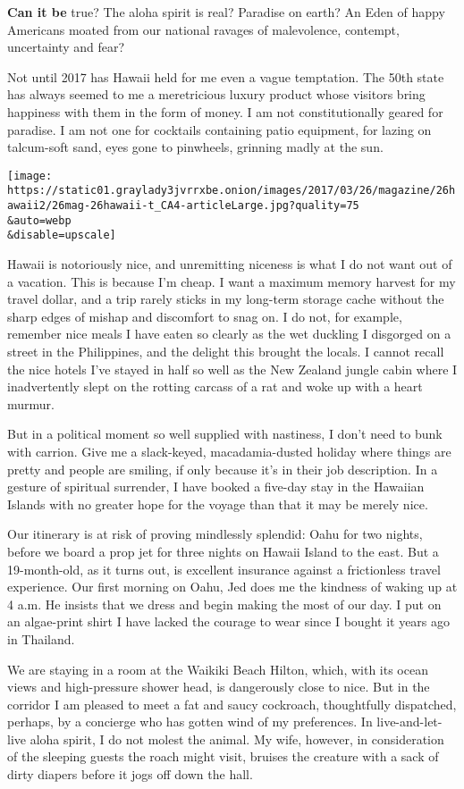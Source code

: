 \textbf{Can it be} true? The aloha spirit is real? Paradise on earth? An
Eden of happy Americans moated from our national ravages of malevolence,
contempt, uncertainty and fear?

Not until 2017 has Hawaii held for me even a vague temptation. The 50th
state has always seemed to me a meretricious luxury product whose
visitors bring happiness with them in the form of money. I am not
constitutionally geared for paradise. I am not one for cocktails
containing patio equipment, for lazing on talcum-soft sand, eyes gone to
pinwheels, grinning madly at the sun.

\texttt{[image: https://static01.graylady3jvrrxbe.onion/images/2017/03/26/magazine/26hawaii2/26mag-26hawaii-t\_CA4-articleLarge.jpg?quality=75\\\&auto=webp\\\&disable=upscale]}

Hawaii is notoriously nice, and unremitting niceness is what I do not
want out of a vacation. This is because I'm cheap. I want a maximum
memory harvest for my travel dollar, and a trip rarely sticks in my
long-term storage cache without the sharp edges of mishap and discomfort
to snag on. I do not, for example, remember nice meals I have eaten so
clearly as the wet duckling I disgorged on a street in the Philippines,
and the delight this brought the locals. I cannot recall the nice hotels
I've stayed in half so well as the New Zealand jungle cabin where I
inadvertently slept on the rotting carcass of a rat and woke up with a
heart murmur.

But in a political moment so well supplied with nastiness, I don't need
to bunk with carrion. Give me a slack-keyed, macadamia-dusted holiday
where things are pretty and people are smiling, if only because it's in
their job description. In a gesture of spiritual surrender, I have
booked a five-day stay in the Hawaiian Islands with no greater hope for
the voyage than that it may be merely nice.

Our itinerary is at risk of proving mindlessly splendid: Oahu for two
nights, before we board a prop jet for three nights on Hawaii Island to
the east. But a 19-month-old, as it turns out, is excellent insurance
against a frictionless travel experience. Our first morning on Oahu, Jed
does me the kindness of waking up at 4 a.m. He insists that we dress and
begin making the most of our day. I put on an algae-print shirt I have
lacked the courage to wear since I bought it years ago in Thailand.

We are staying in a room at the Waikiki Beach Hilton, which, with its
ocean views and high-pressure shower head, is dangerously close to nice.
But in the corridor I am pleased to meet a fat and saucy cockroach,
thoughtfully dispatched, perhaps, by a concierge who has gotten wind of
my preferences. In live-and-let-live aloha spirit, I do not molest the
animal. My wife, however, in consideration of the sleeping guests the
roach might visit, bruises the creature with a sack of dirty diapers
before it jogs off down the hall.

